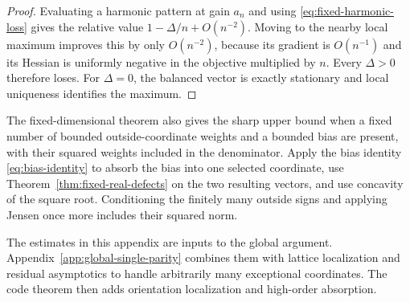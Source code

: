 \begin{proof}
Evaluating a harmonic pattern at gain $a_n$ and using
\eqref{eq:fixed-harmonic-loss} gives the relative value
$1-\Delta/n+O(n^{-2})$. Moving to the nearby local maximum improves
this by only $O(n^{-2})$, because its gradient is $O(n^{-1})$ and its
Hessian is uniformly negative in the objective multiplied by $n$.
Every $\Delta>0$ therefore loses. For $\Delta=0$, the balanced vector
is exactly stationary and local uniqueness identifies the maximum.
\end{proof}

The fixed-dimensional theorem also gives the sharp upper bound when a
fixed number of bounded outside-coordinate weights and a bounded bias
are present, with their squared weights included in the denominator.
Apply the bias identity \eqref{eq:bias-identity} to absorb the bias
into one selected coordinate, use Theorem~\ref{thm:fixed-real-defects}
on the two resulting vectors, and use concavity of the square root.
Conditioning the finitely many outside signs and applying Jensen once
more includes their squared norm.

The estimates in this appendix are inputs to the global argument.
Appendix~\ref{app:global-single-parity} combines them with lattice
localization and residual asymptotics to handle arbitrarily many
exceptional coordinates. The code theorem then adds orientation
localization and high-order absorption.

